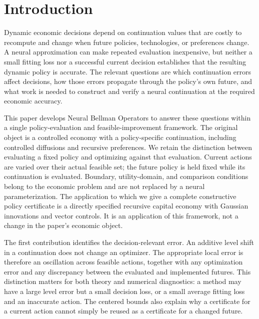 \section{Introduction}\label{sec:r37intro}
Dynamic economic decisions depend on continuation values that are costly to
recompute and change when future policies, technologies, or preferences
change. A neural approximation can make repeated evaluation inexpensive, but
neither a small fitting loss nor a successful current decision establishes
that the resulting dynamic policy is accurate. The relevant questions are
which continuation errors affect decisions, how those errors propagate
through the policy's own future, and what work is needed to construct and
verify a neural continuation at the required economic accuracy.

This paper develops Neural Bellman Operators to answer these questions within
a single policy-evaluation and feasible-improvement framework. The original
object is a controlled economy with a policy-specific continuation, including
controlled diffusions and recursive preferences. We retain the distinction
between evaluating a fixed policy and optimizing against that evaluation.
Current actions are varied over their actual feasible set; the future policy
is held fixed while its continuation is evaluated. Boundary, utility-domain,
and comparison conditions belong to the economic problem and are not
replaced by a neural parameterization. The application to which we give a
complete constructive policy certificate is a directly specified recursive
capital economy with Gaussian innovations and vector controls. It is an
application of this framework, not a change in the paper's economic object.

The first contribution identifies the decision-relevant error. An additive
level shift in a continuation does not change an optimizer. The appropriate
local error is therefore an oscillation across feasible actions, together
with any optimization error and any discrepancy between the evaluated and
implemented futures. This distinction matters for both theory and numerical
diagnostics: a method may have a large level error but a small decision loss,
or a small average fitting loss and an inaccurate action. The centered bounds
also explain why a certificate for a current action cannot simply be reused
as a certificate for a changed future.

